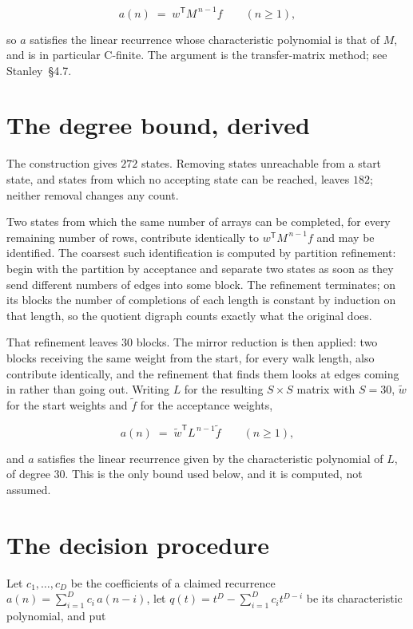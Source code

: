 \documentclass[11pt]{article}
\theoremstyle{definition}
\begin{document}
\[a(n) \;=\; w^{\mathsf T} M^{\,n-1} f \qquad (n \ge 1),\]

so $a$ satisfies the linear recurrence whose characteristic polynomial is that of $M$, and is in particular C-finite. The argument is the transfer-matrix method; see Stanley~\S4.7.

\section{The degree bound, derived}

The construction gives $272$ states. Removing states unreachable from a start state, and states from which no accepting state can be reached, leaves $182$; neither removal changes any count.

Two states from which the same number of arrays can be completed, for every remaining number of rows, contribute identically to $w^{\mathsf T}M^{\,n-1}f$ and may be identified. The coarsest such identification is computed by partition refinement: begin with the partition by acceptance and separate two states as soon as they send different numbers of edges into some block. The refinement terminates; on its blocks the number of completions of each length is constant by induction on that length, so the quotient digraph counts exactly what the original does.

That refinement leaves $30$ blocks. The mirror reduction is then applied: two blocks receiving the same weight from the start, for every walk length, also contribute identically, and the refinement that finds them looks at edges coming in rather than going out. Writing $L$ for the resulting $S \times S$ matrix with $S = 30$, $\tilde w$ for the start weights and $\tilde f$ for the acceptance weights,

\[a(n) \;=\; \tilde w^{\mathsf T} L^{\,n-1} \tilde f \qquad (n \ge 1),\]

and $a$ satisfies the linear recurrence given by the characteristic polynomial of $L$, of degree $30$. This is the only bound used below, and it is computed, not assumed.

\section{The decision procedure}

Let $c_1,\dots,c_D$ be the coefficients of a claimed recurrence $a(n) = \sum_{i=1}^{D} c_i\,a(n-i)$, let $q(t) = t^{D} - \sum_{i=1}^{D} c_i t^{D-i}$ be its characteristic polynomial, and put
\end{document}
